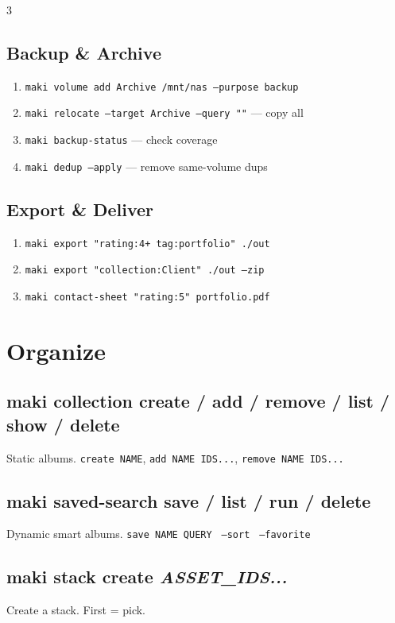 \documentclass[a4paper,landscape,8pt]{article}
\newcommand{\cmd}[1]{\texttt{\footnotesize #1}}
\newcommand{\opt}[1]{\texttt{\scriptsize\color{maki-stone} #1}}
\begin{document}
\begin{multicols}{3}
\subsection{Backup \& Archive}
\begin{enumerate}[leftmargin=1.5em]
\item \cmd{maki volume add Archive /mnt/nas --purpose backup}
\item \cmd{maki relocate --target Archive --query ""} — copy all
\item \cmd{maki backup-status} — check coverage
\item \cmd{maki dedup --apply} — remove same-volume dups
\end{enumerate}

\subsection{Export \& Deliver}
\begin{enumerate}[leftmargin=1.5em]
\item \cmd{maki export "rating:4+ tag:portfolio" ./out}
\item \cmd{maki export "collection:Client" ./out --zip}
\item \cmd{maki contact-sheet "rating:5" portfolio.pdf}
\end{enumerate}

\section{Organize}

\subsection{maki collection create / add / remove / list / show / delete}
Static albums. \cmd{create NAME}, \cmd{add NAME IDS...}, \cmd{remove NAME IDS...}

\subsection{maki saved-search save / list / run / delete}
Dynamic smart albums. \cmd{save NAME QUERY} \opt{--sort} \opt{--favorite}

\subsection{maki stack create \textit{ASSET\_IDS...}}
Create a stack. First = pick.


\end{multicols}
\end{document}
